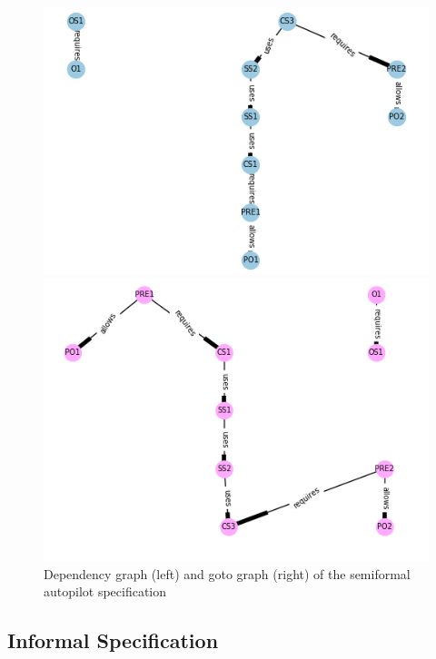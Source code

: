 \begin{figure}[H]
\centering
\begin{minipage}{0.45\textwidth}
\centering
\includegraphics[scale=0.4]{Figures/fullexample/sfdp.png}
\end{minipage}\hfill
\begin{minipage}{0.45\textwidth}
\centering
\includegraphics[scale=0.4]{Figures/fullexample/sfgoto.png}
\end{minipage}
\caption{Dependency graph (left) and goto graph (right) of the semiformal autopilot specification\label{fig:sfdepgoto}}
\end{figure}

\subsection{Informal Specification}

